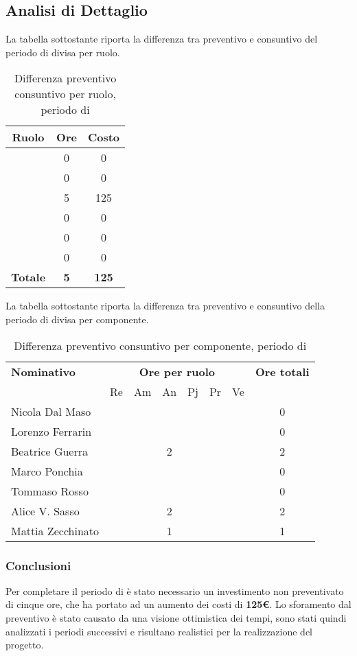 \subsection{Analisi di Dettaglio}
La tabella sottostante riporta la differenza tra preventivo e consuntivo del periodo di \AD{} divisa per ruolo.
\begin{table}[H]
	\centering
	\begin{tabular}{|c|c|c|}
		\hline
		\textbf{Ruolo} &
		\textbf{Ore} &
		\textbf{Costo} \\
		\hline
		\Responsabile & 0 & 0\\
		\hline
		\Amministratore & 0 & 0\\
		\hline
		\Analista & 5 & 125\\
		\hline
		\Progettista & 0 & 0 \\
		\hline
		\Verificatore & 0 & 0\\
		\hline
		\Programmatore & 0 & 0 \\
		\hline
		\textbf{Totale} & \textbf{5} & \textbf{125} \\
		\hline
	\end{tabular}
	\caption{Differenza preventivo consuntivo per ruolo, periodo di \AD}
\end{table}

La tabella sottostante riporta la differenza tra preventivo e consuntivo della periodo di \AD{} divisa per componente.
\begin{table}[H]
	\centering
	\begin{tabular}{|l|c|c|c|c|c|c|c|}
		\hline
		\textbf{Nominativo} & 
		\multicolumn{6}{c|}{\textbf{Ore per ruolo}} & 
		\textbf{Ore totali} \\
		& Re & Am & An & Pj & Pr & Ve & \\
		\hline
		Nicola Dal Maso & & & & & & & 0 \\
		Lorenzo Ferrarin & & & & & & & 0 \\
		Beatrice Guerra & & &2 & & & & 2 \\
		Marco Ponchia & & & & & & & 0 \\
		Tommaso Rosso & & & & & & & 0 \\
		Alice V. Sasso & & & 2& & & & 2 \\
		Mattia Zecchinato & & &1 & & & & 1  \\
		\hline
	\end{tabular}
	\caption{Differenza preventivo consuntivo per componente, periodo di \AD}
\end{table}
\subsubsection{Conclusioni}
Per completare il periodo di \AD{} è stato necessario un investimento non preventivato di cinque ore, che ha portato ad un aumento dei costi di \textbf{125€}. Lo sforamento dal preventivo è stato causato da una visione ottimistica dei tempi, sono stati quindi analizzati i periodi successivi e risultano realistici per la realizzazione del progetto.
